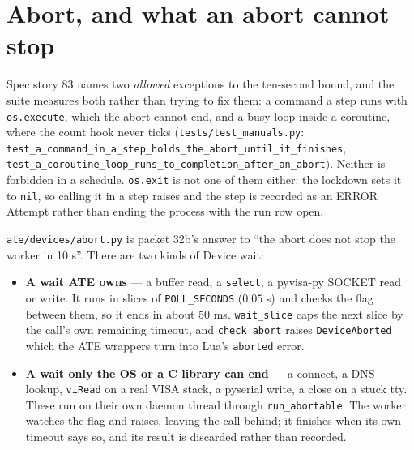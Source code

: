 \section{Abort, and what an abort cannot stop}

Spec story 83 names two \emph{allowed} exceptions to the ten-second bound, and the suite measures both
rather than trying to fix them: a command a step runs with \texttt{os.execute}, which the abort
cannot end, and a busy loop inside a coroutine, where the count hook never ticks
(\texttt{tests/test\_\allowbreak{}manuals.py}: \texttt{test\_\allowbreak{}a\_\allowbreak{}command\_\allowbreak{}in\_\allowbreak{}a\_\allowbreak{}step\_\allowbreak{}holds\_\allowbreak{}the\_\allowbreak{}abort\_\allowbreak{}until\_\allowbreak{}it\_\allowbreak{}finishes},
\texttt{test\_\allowbreak{}a\_\allowbreak{}coroutine\_\allowbreak{}loop\_\allowbreak{}runs\_\allowbreak{}to\_\allowbreak{}completion\_\allowbreak{}after\_\allowbreak{}an\_\allowbreak{}abort}).
Neither is forbidden in a schedule. \texttt{os.exit} is not one of them either: the lockdown sets it
to \texttt{nil}, so calling it in a step raises and the step is recorded as an ERROR Attempt rather
than ending the process with the run row open.

\texttt{ate/devices/abort.py} is packet 32b's answer to ``the abort does not stop the worker in 10 s''.
There are two kinds of Device wait:

\begin{itemize}
  \item \textbf{A wait ATE owns} --- a buffer read, a \texttt{select}, a pyvisa-py SOCKET read or write.
    It runs in slices of \texttt{POLL\_SECONDS} ($0.05$ s) and checks the flag between them, so
    it ends in about 50 ms. \texttt{wait\_slice} caps the next slice by the call's own remaining timeout,
    and \texttt{check\_abort} raises \texttt{DeviceAborted} which the ATE wrappers turn into Lua's
    \texttt{aborted} error.
  \item \textbf{A wait only the OS or a C library can end} --- a connect, a DNS lookup, \texttt{viRead} on
    a real VISA stack, a pyserial write, a close on a stuck tty. These run on their own daemon thread
    through \texttt{run\_abortable}. The worker watches the flag and raises, leaving the call behind; it
    finishes when its own timeout says so, and its result is discarded rather than recorded.
\end{itemize}

